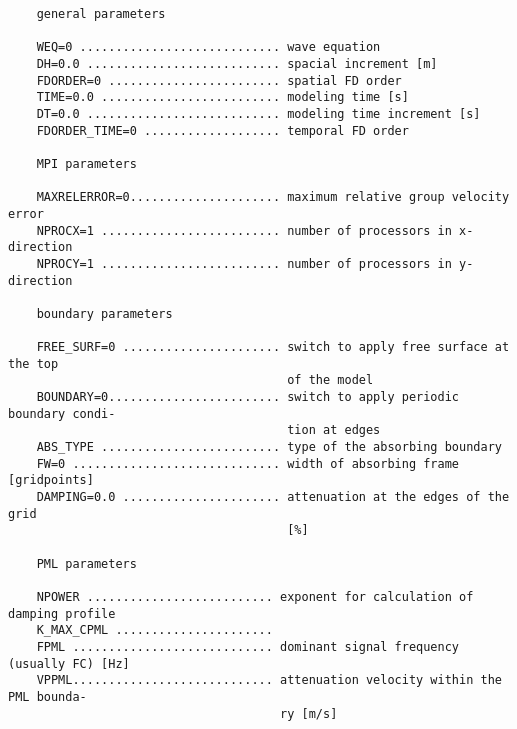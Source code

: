 \begin{verbatim}
    general parameters
    
    WEQ=0 ............................ wave equation
    DH=0.0 ........................... spacial increment [m]
    FDORDER=0 ........................ spatial FD order 
    TIME=0.0 ......................... modeling time [s]
    DT=0.0 ........................... modeling time increment [s]
    FDORDER_TIME=0 ................... temporal FD order
    
    MPI parameters
    
    MAXRELERROR=0..................... maximum relative group velocity error
    NPROCX=1 ......................... number of processors in x-direction
    NPROCY=1 ......................... number of processors in y-direction
    
    boundary parameters
    
    FREE_SURF=0 ...................... switch to apply free surface at the top 
                                       of the model
    BOUNDARY=0........................ switch to apply periodic boundary condi- 
                                       tion at edges
    ABS_TYPE ......................... type of the absorbing boundary
    FW=0 ............................. width of absorbing frame [gridpoints]
    DAMPING=0.0 ...................... attenuation at the edges of the grid
                                       [%]
    
    PML parameters
    
    NPOWER .......................... exponent for calculation of damping profile
    K_MAX_CPML ...................... 
    FPML ............................ dominant signal frequency (usually FC) [Hz]
    VPPML............................ attenuation velocity within the PML bounda- 
                                      ry [m/s]
\end{verbatim}